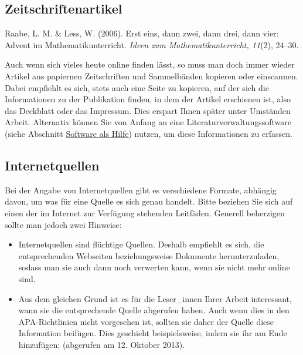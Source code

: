 \documentclass[ngerman,bibliography=totoc,oneside,12pt,a4paper]{scrbook}
\begin{document}
\subsection*{Zeitschriftenartikel}\label{zeitschriftenartikel}

Raabe, L. M. \& Less, W. (2006). Erst eins, dann
zwei, dann drei, dann vier: Advent im Mathematikunterricht. \emph{Ideen
zum Mathematikunterricht, 11}(2), 24--30.

Auch wenn sich vieles heute online finden lässt, so muss man doch immer
wieder Artikel aus papiernen Zeitschriften und Sammelbänden kopieren
oder einscannen. Dabei empfiehlt es sich, stets auch eine Seite zu
kopieren, auf der sich die Informationen zu der Publikation finden, in
dem der Artikel erschienen ist, also das Deckblatt oder das Impressum.
Dies erspart Ihnen später unter Umständen Arbeit. Alternativ können Sie
von Anfang an eine Literaturverwaltungssoftware (siehe Abschnitt
\protect\hyperlink{sec:software}{Software als Hilfe}) nutzen, um diese
Informationen zu erfassen.

\subsection*{Internetquellen}\label{internetquellen}

Bei der Angabe von Internetquellen gibt es verschiedene Formate,
abhängig davon, um was für eine Quelle es sich genau handelt. Bitte
beziehen Sie sich auf einen der im Internet zur Verfügung stehenden
Leitfäden. Generell beherzigen sollte man jedoch zwei Hinweise:

\begin{itemize}
\item
  Internetquellen sind flüchtige Quellen. Deshalb empfiehlt es sich, die
  entsprechenden Webseiten beziehungsweise Dokumente herunterzuladen,
  sodass man sie auch dann noch verwerten kann, wenn sie nicht mehr
  online sind.
\item
  Aus dem gleichen Grund ist es für die Leser\_innen Ihrer Arbeit
  interessant, wann sie die entsprechende Quelle abgerufen haben. Auch
  wenn dies in den APA-Richtlinien nicht vorgesehen ist, sollten sie
  daher der Quelle diese Information beifügen. Dies geschieht
  beispielsweise, indem sie ihr am Ende hinzufügen: (abgerufen am 12.
  Oktober 2013).
\end{itemize}
\end{document}
